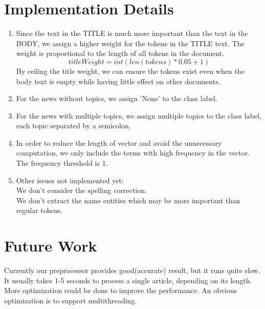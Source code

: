 \documentclass{article}
\begin{document}
\section{Implementation Details}
\begin{enumerate}
  \item  Since the text in the TITLE is much more important than the text in the
  BODY, we assign a higher weight for the tokens in the TITLE text.
  The weight is proportional to the length of all tokens in the document.
\begin{equation}
titleWeight = int(len(tokens) * 0.05 + 1)
\end{equation}
By ceiling the title weight, we can ensure the tokens exist even when the body
text is empty while having little effect on other documents.
  \item  For the news without topics, we assign 'None' to the class label.
  \item  For the news with multiple topics, we assign multiple topics to the
  class label, each topic separated by a semicolon.
  \item  In order to reduce the length of vector and avoid the unnecessary
  computation, we only include the terms with high frequency in the vector. The
  frequency threshold is 1.
  \item Other issues not implemented yet:\\
We don't consider the spelling correction.\\
We don't extract the name entities which may be more important
than regular tokens.
\end{enumerate}

\section{Future Work}
Currently our preprocessor provides good(accurate) result, but it runs quite
slow. It usually takes 1-5 seconds to process a single article, depending on
its length. More optimization could be done to improve the performance. An
obvious optimization is to support multithreading.

\end{document}
